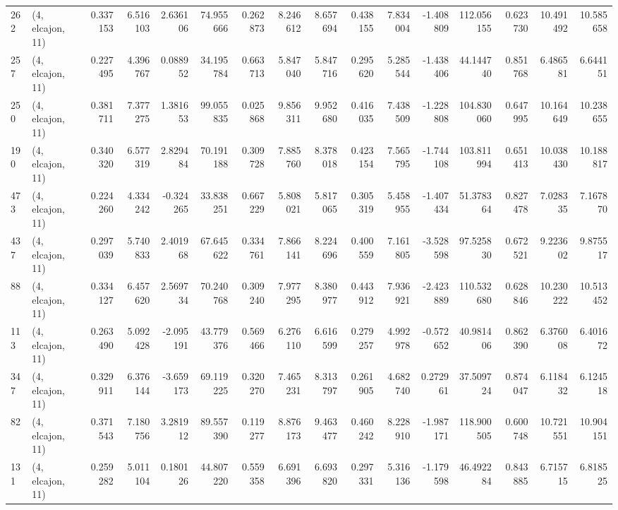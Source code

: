\begin{tabular}{llrrrrrrrrrrrrrr}
262 &  (4, elcajon, 11) &   0.337153 &   6.516103 &   2.636106 &    74.955666 &   0.262873 &   8.246612 &   8.657694 &  0.438155 &   7.834004 &  -1.408809 &   112.056155 &  0.623730 &  10.491492 &  10.585658 \\
257 &  (4, elcajon, 11) &   0.227495 &   4.396767 &   0.088952 &    34.195784 &   0.663713 &   5.847040 &   5.847716 &  0.295620 &   5.285544 &  -1.438406 &    44.144740 &  0.851768 &   6.486581 &   6.644151 \\
250 &  (4, elcajon, 11) &   0.381711 &   7.377275 &   1.381653 &    99.055835 &   0.025868 &   9.856311 &   9.952680 &  0.416035 &   7.438509 &  -1.228808 &   104.830060 &  0.647995 &  10.164649 &  10.238655 \\
190 &  (4, elcajon, 11) &   0.340320 &   6.577319 &   2.829484 &    70.191188 &   0.309728 &   7.885760 &   8.378018 &  0.423154 &   7.565795 &  -1.744108 &   103.811994 &  0.651413 &  10.038430 &  10.188817 \\
473 &  (4, elcajon, 11) &   0.224260 &   4.334242 &  -0.324265 &    33.838251 &   0.667229 &   5.808021 &   5.817065 &  0.305319 &   5.458955 &  -1.407434 &    51.378364 &  0.827478 &   7.028335 &   7.167870 \\
437 &  (4, elcajon, 11) &   0.297039 &   5.740833 &   2.401968 &    67.645622 &   0.334761 &   7.866141 &   8.224696 &  0.400559 &   7.161805 &  -3.528598 &    97.525830 &  0.672521 &   9.223602 &   9.875517 \\
88  &  (4, elcajon, 11) &   0.334127 &   6.457620 &   2.569734 &    70.240768 &   0.309240 &   7.977295 &   8.380977 &  0.443912 &   7.936921 &  -2.423889 &   110.532680 &  0.628846 &  10.230222 &  10.513452 \\
113 &  (4, elcajon, 11) &   0.263490 &   5.092428 &  -2.095191 &    43.779376 &   0.569466 &   6.276110 &   6.616599 &  0.279257 &   4.992978 &  -0.572652 &    40.981406 &  0.862390 &   6.376008 &   6.401672 \\
347 &  (4, elcajon, 11) &   0.329911 &   6.376144 &  -3.659173 &    69.119225 &   0.320270 &   7.465231 &   8.313797 &  0.261905 &   4.682740 &   0.272961 &    37.509724 &  0.874047 &   6.118432 &   6.124518 \\
82  &  (4, elcajon, 11) &   0.371543 &   7.180756 &   3.281912 &    89.557390 &   0.119277 &   8.876173 &   9.463477 &  0.460242 &   8.228910 &  -1.987171 &   118.900505 &  0.600748 &  10.721551 &  10.904151 \\
131 &  (4, elcajon, 11) &   0.259282 &   5.011104 &   0.180126 &    44.807220 &   0.559358 &   6.691396 &   6.693820 &  0.297331 &   5.316136 &  -1.179598 &    46.492284 &  0.843885 &   6.715715 &   6.818525 \\

\end{tabular}

